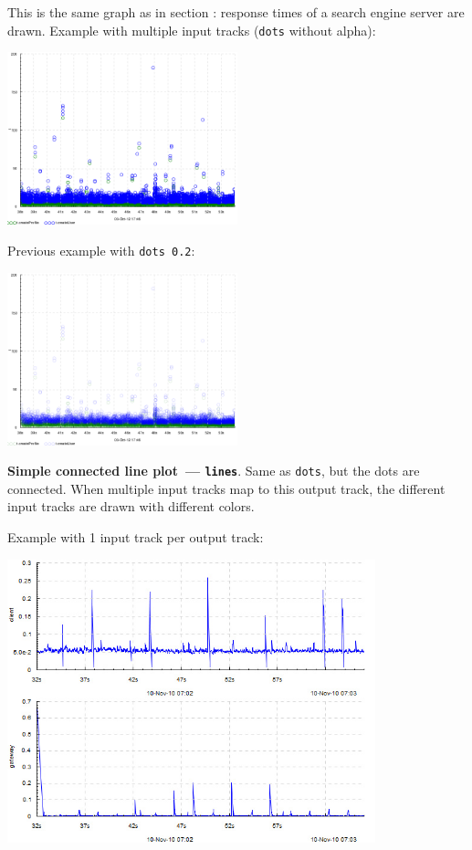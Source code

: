 \documentclass{article}
\begin{document}
This is the same graph as in section : response times of a search engine server are drawn.
Example with multiple input tracks (\texttt{dots} without alpha):

\centerline{\includegraphics[width=0.5\textwidth]{pics/tplot/dots-create-user-and-profile.png}}

Previous example with \texttt{dots 0.2}:

\centerline{\includegraphics[width=0.5\textwidth]{pics/tplot/dots-create-user-and-profile-alpha.png}}

\pagebreak
\noindent
\textbf{Simple connected line plot~--- \texttt{lines}}. Same as \texttt{dots}, but the dots are connected. When multiple input tracks map to this output track, the different input tracks are drawn with different colors.

Example with 1 input track per output track:

\centerline{\includegraphics[width=0.8\textwidth]{pics/tplot/lines.png}}
\end{document}
